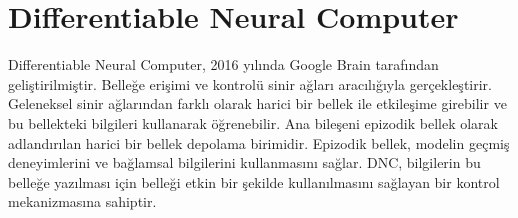 \section{Differentiable Neural Computer}
Differentiable Neural Computer, 2016 yılında Google Brain tarafından geliştirilmiştir. Belleğe erişimi ve kontrolü sinir ağları aracılığıyla gerçekleştirir. Geleneksel sinir ağlarından farklı olarak harici bir bellek ile etkileşime girebilir ve bu bellekteki bilgileri kullanarak öğrenebilir. Ana bileşeni epizodik bellek olarak adlandırılan harici bir bellek depolama birimidir. Epizodik bellek, modelin geçmiş deneyimlerini ve bağlamsal bilgilerini kullanmasını sağlar. DNC, bilgilerin bu belleğe yazılması için belleği etkin bir şekilde kullanılmasını sağlayan bir kontrol mekanizmasına sahiptir. 

\newpage